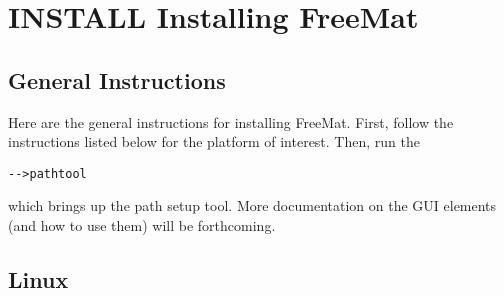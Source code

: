 \section{INSTALL Installing FreeMat}

\subsection{General Instructions}

Here are the general instructions for installing FreeMat.  First, follow the 
instructions listed below for the platform of interest.  Then, run the
\begin{verbatim}
-->pathtool
\end{verbatim}
which brings up the path setup tool.  More documentation on the GUI elements
(and how to use them) will be forthcoming.  
\subsection{Linux}

